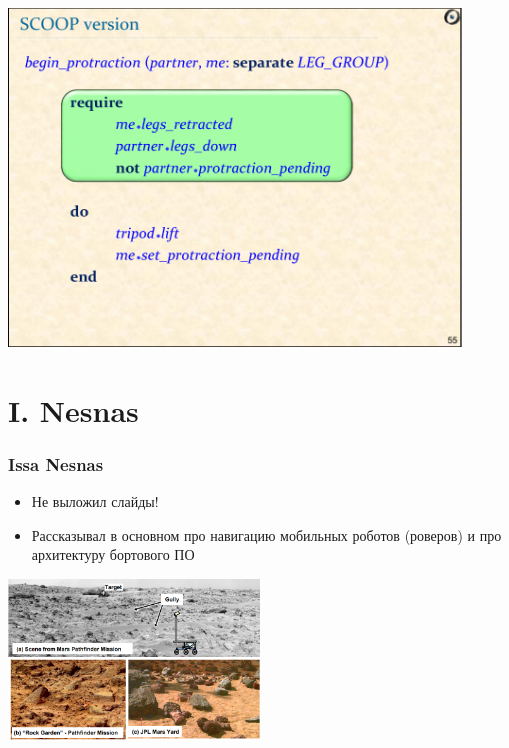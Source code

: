 \documentclass[xetex,mathserif,serif]{beamer}
\begin{document}
	\begin{frame}
		\begin{center}
			\includegraphics[width=0.9\textwidth]{meyer10.png}
		\end{center}
	\end{frame}

	\section{I. Nesnas}
	
	\begin{frame}
		\frametitle{Issa Nesnas}
		\begin{itemize}
			\item Не выложил слайды!
			\item Рассказывал в основном про навигацию мобильных роботов (роверов) и про архитектуру бортового ПО
		\end{itemize}
		\begin{center}
			\includegraphics[width=0.5\textwidth]{pathfinder.png}
		\end{center}
	\end{frame}
\end{document}

